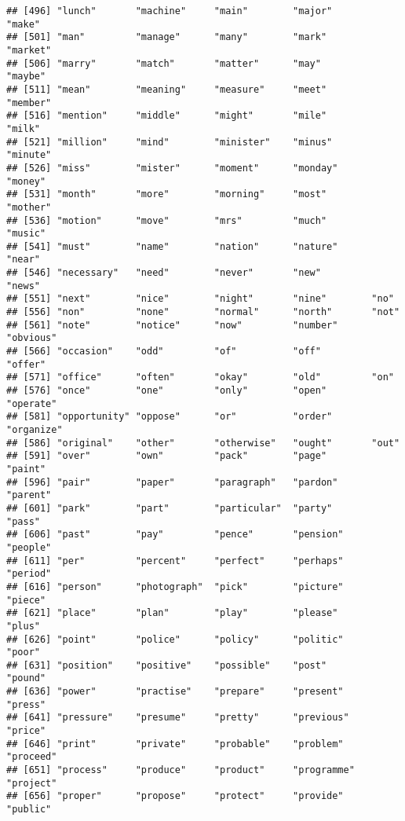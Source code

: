 \documentclass[
]{article}
\begin{document}
\begin{verbatim}
## [496] "lunch"       "machine"     "main"        "major"       "make"       
## [501] "man"         "manage"      "many"        "mark"        "market"     
## [506] "marry"       "match"       "matter"      "may"         "maybe"      
## [511] "mean"        "meaning"     "measure"     "meet"        "member"     
## [516] "mention"     "middle"      "might"       "mile"        "milk"       
## [521] "million"     "mind"        "minister"    "minus"       "minute"     
## [526] "miss"        "mister"      "moment"      "monday"      "money"      
## [531] "month"       "more"        "morning"     "most"        "mother"     
## [536] "motion"      "move"        "mrs"         "much"        "music"      
## [541] "must"        "name"        "nation"      "nature"      "near"       
## [546] "necessary"   "need"        "never"       "new"         "news"       
## [551] "next"        "nice"        "night"       "nine"        "no"         
## [556] "non"         "none"        "normal"      "north"       "not"        
## [561] "note"        "notice"      "now"         "number"      "obvious"    
## [566] "occasion"    "odd"         "of"          "off"         "offer"      
## [571] "office"      "often"       "okay"        "old"         "on"         
## [576] "once"        "one"         "only"        "open"        "operate"    
## [581] "opportunity" "oppose"      "or"          "order"       "organize"   
## [586] "original"    "other"       "otherwise"   "ought"       "out"        
## [591] "over"        "own"         "pack"        "page"        "paint"      
## [596] "pair"        "paper"       "paragraph"   "pardon"      "parent"     
## [601] "park"        "part"        "particular"  "party"       "pass"       
## [606] "past"        "pay"         "pence"       "pension"     "people"     
## [611] "per"         "percent"     "perfect"     "perhaps"     "period"     
## [616] "person"      "photograph"  "pick"        "picture"     "piece"      
## [621] "place"       "plan"        "play"        "please"      "plus"       
## [626] "point"       "police"      "policy"      "politic"     "poor"       
## [631] "position"    "positive"    "possible"    "post"        "pound"      
## [636] "power"       "practise"    "prepare"     "present"     "press"      
## [641] "pressure"    "presume"     "pretty"      "previous"    "price"      
## [646] "print"       "private"     "probable"    "problem"     "proceed"    
## [651] "process"     "produce"     "product"     "programme"   "project"    
## [656] "proper"      "propose"     "protect"     "provide"     "public"     

\end{verbatim}
\end{document}
